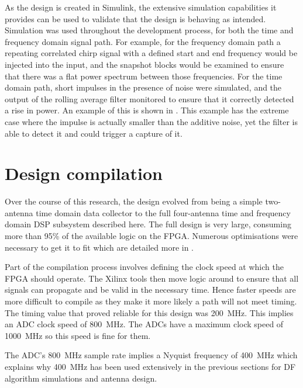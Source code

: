 As the design is created in Simulink, the extensive simulation capabilities it provides can be used to validate that the design is behaving as intended. Simulation was used throughout the development process, for both the time and frequency domain signal path. For example, for the frequency domain path a repeating correlated chirp signal with a defined start and end frequency would be injected into the input, and the snapshot blocks would be examined to ensure that there was a flat power spectrum between those frequencies. For the time domain path, short impulses in the presence of noise were simulated, and the output of the rolling average filter monitored to ensure that it correctly detected a rise in power. An example of this is shown in . This example has the extreme case where the impulse is actually smaller than the additive noise, yet the filter is able to detect it and could trigger a capture of it.

\section{Design compilation}
Over the course of this research, the design evolved from being a simple two-antenna time domain data collector to the full four-antenna time and frequency domain DSP subsystem described here. The full design is very large, consuming more than 95\% of the available logic on the FPGA. Numerous optimisations were necessary to get it to fit which are detailed more in .

Part of the compilation process involves defining the clock speed at which the FPGA should operate. The Xilinx tools then move logic around to ensure that all signals can propagate and be valid in the necessary time. Hence faster speeds are more difficult to compile as they make it more likely a path will not meet timing. The timing value that proved reliable for this design was \SI{200}{\mega\hertz}. This implies an ADC clock speed of \SI{800}{\mega\hertz}. The ADCs have a maximum clock speed of \SI{1000}{\mega\hertz} so this speed is fine for them. 

The ADC's \SI{800}{\mega\hertz} sample rate implies a Nyquist frequency of \SI{400}{\mega\hertz} which explains why \SI{400}{\mega\hertz} has been used extensively in the previous sections for DF algorithm simulations and antenna design.




